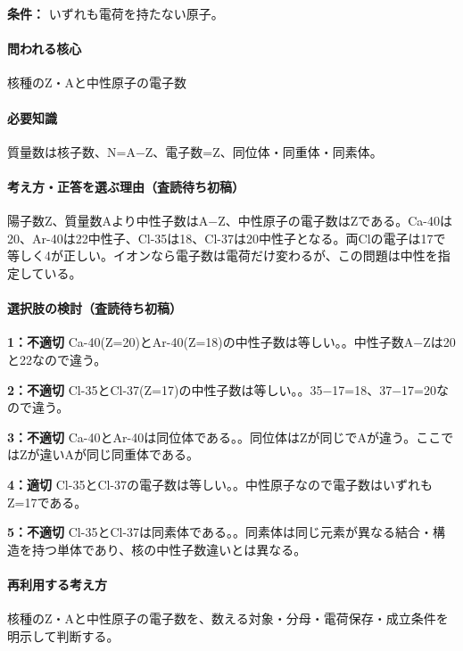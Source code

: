 \noindent\textbf{条件：} いずれも電荷を持たない原子。\par

\paragraph{問われる核心} 核種のZ・Aと中性原子の電子数

\paragraph{必要知識} 質量数は核子数、N=\allowbreak{}A−Z、電子数=Z、同位体・同重体・同素体。

\paragraph{考え方・正答を選ぶ理由（査読待ち初稿）} 陽子数Z、質量数Aより中性子数はA−Z、中性原子の電子数はZである。Ca-40は20、Ar-40は22中性子、Cl-35は18、Cl-37は20中性子となる。両Clの電子は17で等しく4が正しい。イオンなら電子数は電荷だけ変わるが、この問題は中性を指定している。

\paragraph{選択肢の検討（査読待ち初稿）}\mbox{}\par

\noindent\textbf{1：不適切} Ca-40(Z=\allowbreak{}20)とAr-40(Z=\allowbreak{}18)の中性子数は等しい。。中性子数A−Zは20と22なので違う。\par

\noindent\textbf{2：不適切} Cl-35とCl-37(Z=\allowbreak{}17)の中性子数は等しい。。35−17=\allowbreak{}18、37−17=\allowbreak{}20なので違う。\par

\noindent\textbf{3：不適切} Ca-40とAr-40は同位体である。。同位体はZが同じでAが違う。ここではZが違いAが同じ同重体である。\par

\noindent\textbf{4：適切} Cl-35とCl-37の電子数は等しい。。中性原子なので電子数はいずれもZ=\allowbreak{}17である。\par

\noindent\textbf{5：不適切} Cl-35とCl-37は同素体である。。同素体は同じ元素が異なる結合・構造を持つ単体であり、核の中性子数違いとは異なる。\par

\paragraph{再利用する考え方} 核種のZ・Aと中性原子の電子数を、数える対象・分母・電荷保存・成立条件を明示して判断する。

